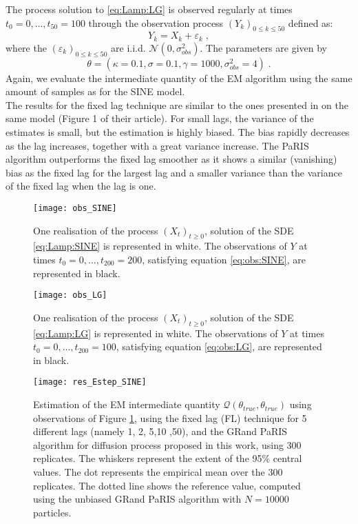 \documentclass[12pt,draft]{article}
\newcommand{\eqsp}{\;}
\newcommand{\1}{\mathrm{1}}
\begin{document}
The process solution to \eqref{eq:Lamp:LG} is observed regularly at times $t_0=0,\dots,t_{50}=100$ through the observation process $(Y_k)_{0\le k\le 50}$ defined as:
\begin{equation}
Y_k = X_k + \varepsilon_k\label{eq:obs:LG}\eqsp,
\end{equation}
where the $(\varepsilon_k)_{0\le k \le 50}$ are i.i.d. $ \mathcal{N}(0,\sigma^2_{obs})$.
The parameters are given by $$\theta =(\kappa=0.1,\sigma=0.1,\gamma=1000,\sigma^2_{obs}=4)\eqsp.$$
Again, we evaluate the intermediate quantity of the EM algorithm using the same amount of samples as for the SINE model.\\
The results for the fixed lag technique are similar to the ones presented in \cite{olsson:strojby:2011} on the same model (Figure 1 of their article). For small lags, the variance of the estimates is small, but the estimation is highly biased. The bias rapidly decreases as the lag increases, together with a  great variance increase.  The PaRIS algorithm outperforms the fixed lag smoother as it shows  a similar (vanishing) bias as the fixed lag for the largest lag and a smaller variance than the variance of the fixed lag when the lag is one. 
\begin{figure}[p]
\centering
\texttt{[image: obs\_SINE]}
\caption{One realisation of the process $(X_t)_{t\geq 0}$, solution of the SDE \eqref{eq:Lamp:SINE} is represented in white. The observations of $Y$ at times $t_0=0,\dots,t_{200}=200$, satisfying equation \eqref{eq:obs:SINE},  are represented in black.}
\label{fig:obs:SINE}
\end{figure}
\begin{figure}[p]
\centering
\texttt{[image: obs\_LG]}
\caption{One realisation of the process $(X_t)_{t\geq 0}$, solution of the SDE \eqref{eq:Lamp:LG} is represented in white. The observations of $Y$ at times $t_0=0,\dots,t_{200}=100$, satisfying equation \eqref{eq:obs:LG},  are represented in black.}
\label{fig:obs:LG}
\end{figure}
\begin{figure}[p]
\centering
\texttt{[image: res\_Estep\_SINE]}
\caption{Estimation of the EM intermediate quantity $\mathcal{Q}(\theta_{true},\theta_{true})$ using observations of Figure \ref{fig:obs:SINE}, using the fixed lag (FL) technique for 5 different lags (namely 1, 2, 5,10 ,50), and the GRand PaRIS algorithm for diffusion process proposed in this work, using 300 replicates. The whiskers represent the extent of the 95\% central values. The dot represents the empirical mean over the 300 replicates. The dotted line shows the reference value, computed using the unbiased GRand PaRIS algorithm with $N=10000$ particles.}
\label{fig:res:SINE}
\end{figure}
\end{document}
